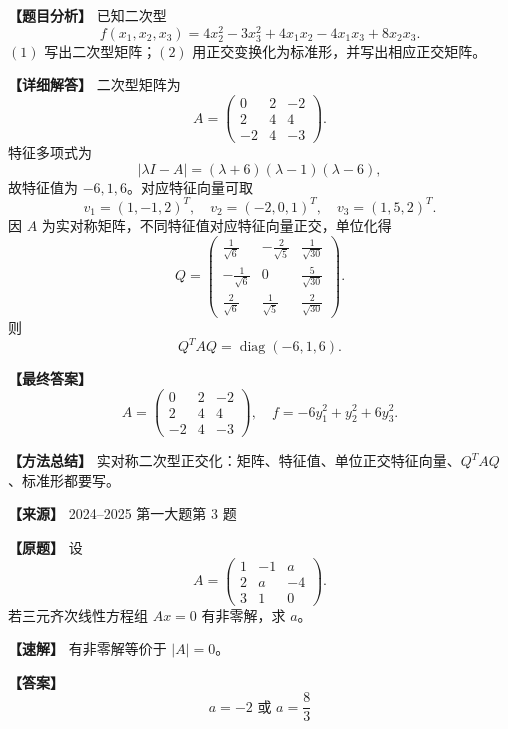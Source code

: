 \documentclass[11pt,a4paper,UTF8]{ctexart}
\newcommand{\diag}{\operatorname{diag}}
\begin{document}
\begin{answerbox}
\textbf{【题目分析】} 已知二次型
\[
f(x_1,x_2,x_3)=4x_2^2-3x_3^2+4x_1x_2-4x_1x_3+8x_2x_3.
\]
$(1)$ 写出二次型矩阵；$(2)$ 用正交变换化为标准形，并写出相应正交矩阵。

\textbf{【详细解答】} 二次型矩阵为
\[
A=\begin{pmatrix}
0&2&-2\\
2&4&4\\
-2&4&-3
\end{pmatrix}.
\]
特征多项式为
\[
|\lambda I-A|=(\lambda+6)(\lambda-1)(\lambda-6),
\]
故特征值为 $-6,1,6$。对应特征向量可取
\[
v_1=(1,-1,2)^T,\quad v_2=(-2,0,1)^T,\quad v_3=(1,5,2)^T.
\]
因 $A$ 为实对称矩阵，不同特征值对应特征向量正交，单位化得
\[
Q=\begin{pmatrix}
\frac1{\sqrt6}&-\frac2{\sqrt5}&\frac1{\sqrt{30}}\\
-\frac1{\sqrt6}&0&\frac5{\sqrt{30}}\\
\frac2{\sqrt6}&\frac1{\sqrt5}&\frac2{\sqrt{30}}
\end{pmatrix}.
\]
则
\[
Q^TAQ=\diag(-6,1,6).
\]

\textbf{【最终答案】}
\[
A=\begin{pmatrix}0&2&-2\\2&4&4\\-2&4&-3\end{pmatrix},
\quad
f=-6y_1^2+y_2^2+6y_3^2.
\]

\textbf{【方法总结】} 实对称二次型正交化：矩阵、特征值、单位正交特征向量、$Q^TAQ$、标准形都要写。
\end{answerbox}

\begin{answerbox}
\textbf{【来源】} 2024--2025 第一大题第 3 题

\textbf{【原题】}
设
\[
A=\begin{pmatrix}1&-1&a\\2&a&-4\\3&1&0\end{pmatrix}.
\]
若三元齐次线性方程组 $Ax=0$ 有非零解，求 $a$。

\textbf{【速解】}
有非零解等价于 $|A|=0$。

\textbf{【答案】}
\[a=-2\text{ 或 }a=\frac83\]
\end{answerbox}
\end{document}
